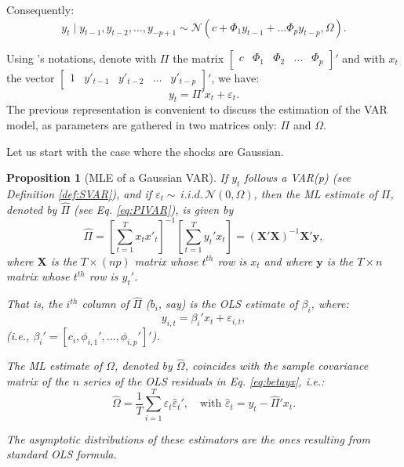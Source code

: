 \documentclass[
  12pt,
]{book}
\newtheorem{proposition}{Proposition}[chapter]
\theoremstyle{definition}
\theoremstyle{definition}
\theoremstyle{definition}
\theoremstyle{definition}
\theoremstyle{remark}
\begin{document}
Consequently:
\[
y_{t}\mid y_{t-1},y_{t-2},\ldots,y_{-p+1}\sim \mathcal{N}(c+\Phi_{1}y_{t-1}+\ldots\Phi_{p}y_{t-p},\Omega).
\]

Using \citet{Hamilton_1994}'s notations, denote with \(\Pi\) the matrix \(\left[\begin{array}{ccccc} c & \Phi_{1} & \Phi_{2} & \ldots & \Phi_{p}\end{array}\right]'\) and with \(x_{t}\) the vector \(\left[\begin{array}{ccccc} 1 & y'_{t-1} & y'_{t-2} & \ldots & y'_{t-p}\end{array}\right]'\), we have:
\begin{equation}
y_{t}= \Pi'x_{t} + \varepsilon_{t}. \label{eq:PIVAR}
\end{equation}
The previous representation is convenient to discuss the estimation of the VAR model, as parameters are gathered in two matrices only: \(\Pi\) and \(\Omega\).

Let us start with the case where the shocks are Gaussian.

\begin{proposition}[MLE of a Gaussian VAR]
\protect\hypertarget{prp:estimVARGaussian}{}\label{prp:estimVARGaussian}If \(y_t\) follows a VAR(p) (see Definition \ref{def:SVAR}), and if \(\varepsilon_t \sim \,i.i.d.\,\mathcal{N}(0,\Omega)\), then the ML estimate of \(\Pi\), denoted by \(\hat{\Pi}\) (see Eq. \eqref{eq:PIVAR}), is given by
\begin{equation}
\hat{\Pi}=\left[\sum_{t=1}^{T}x_{t}x'_{t}\right]^{-1}\left[\sum_{t=1}^{T}y_{t}'x_{t}\right]= (\mathbf{X}'\mathbf{X})^{-1}\mathbf{X}'\mathbf{y},\label{eq:Pi}
\end{equation}
where \(\mathbf{X}\) is the \(T \times (np)\) matrix whose \(t^{th}\) row is \(x_t\) and where \(\mathbf{y}\) is the \(T \times n\) matrix whose \(t^{th}\) row is \(y_{t}'\).

That is, the \(i^{th}\) column of \(\hat{\Pi}\) (\(b_i\), say) is the OLS estimate of \(\beta_i\), where:
\begin{equation}
y_{i,t} = \beta_i'x_t + \varepsilon_{i,t},\label{eq:betayx}
\end{equation}
(i.e., \(\beta_i' = [c_i,\phi_{i,1}',\dots,\phi_{i,p}']'\)).

The ML estimate of \(\Omega\), denoted by \(\hat{\Omega}\), coincides with the sample covariance matrix of the \(n\) series of the OLS residuals in Eq. \eqref{eq:betayx}, i.e.:
\begin{equation}
\hat{\Omega} = \frac{1}{T} \sum_{i=1}^T \hat{\varepsilon}_t\hat{\varepsilon}_t',\quad\mbox{with } \hat{\varepsilon}_t= y_t - \hat{\Pi}'x_t.
\end{equation}

The asymptotic distributions of these estimators are the ones resulting from standard OLS formula.
\end{proposition}
\end{document}
